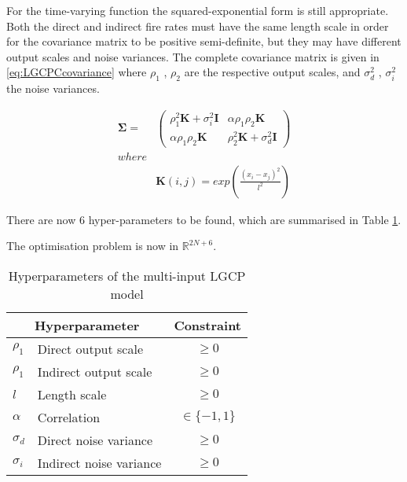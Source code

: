\documentclass[a4paper,11pt]{report}
\begin{document}
For the time-varying function the squared-exponential form is still appropriate. Both the direct and indirect fire rates must have the same length scale in order for the covariance matrix to be positive semi-definite, but they may have different output scales and noise variances. The complete covariance matrix is given in \ref{eq:LGCPCcovariance} where \(\rho_1\) , \(\rho_2\) are the respective output scales, and \(\sigma_d^2\) , \(\sigma_i^2\) the noise variances.

\begin{equation} \label{eq:LGCPCcovariance}
\begin{aligned}
\boldsymbol{\Sigma} =&  \left( \begin{array}{cc}
\rho_1^2 \mathbf{K} + \sigma_i^2 \mathbf{I} & \alpha \rho_1 \rho_2 \mathbf{K}  \\
\alpha \rho_1 \rho_2 \mathbf{K} & \rho_2^2 \mathbf{K} + \sigma_d^2 \mathbf{I} \end{array} \right) \\ where\\
&\mathbf{K}(i,j) = exp\left( \frac{(x_i-x_j)^2}{l^2}\right)
\end{aligned}
\end{equation}

There are now 6 hyper-parameters to be found, which are summarised in Table \ref{LGCPChyperparameters}. 

The optimisation problem is now in \(\mathds{R}^{2N+6}\).


\begin{table}[]
\centering
\caption{Hyperparameters of the multi-input LGCP model}
\label{LGCPChyperparameters}
\begin{tabular}{ll|c}
\multicolumn{2}{c|}{\textbf{Hyperparameter}} & \textbf{Constraint} \\ \hline
\(\rho_1\)           & Direct output scale             & \(\geq0\)            \\
\(\rho_1\)             & Indirect output scale           & \(\geq0\)            \\
\(l\)          & Length scale                    & \(\geq0\)            \\
\(\alpha\)             & Correlation                     &  \(\in\{-1,1\}\)                   \\
\(\sigma_d\)             & Direct noise variance           &    \(\geq0\)                 \\
\(\sigma_i\)           & Indirect noise variance         &     \(\geq0\)               
\end{tabular}
\end{table}
\end{document}
